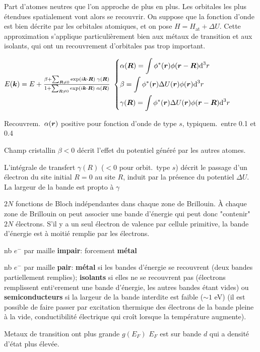 Part d'atomes neutres que l'on approche de plus en plus.
Les orbitales les plus étendues spatialement vont alors se recouvrir. 
On suppose que la fonction d'onde est bien décrite par les orbitales
atomiques, et on pose $H = H_{\text{at}} + \Delta U$. 
Cette approximation s'applique particulièrement
bien aux métaux de transition et aux isolants, qui ont un recouvrement d'orbitales pas
trop important.
\begin{squishlist}
    \item $E(\bm{k}) = E + \frac{\beta + \sum_{\bm{R} \neq 0}\exp(i\bm{k} \cdot \bm{R}) \; \gamma(\bm{R})}{1 + \sum_{\bm{R} \neq 0}\exp(i\bm{k} \cdot \bm{R})\; \alpha(\bm{R})}$
    $\left\{ \begin{aligned}
        & \alpha(\bm{R}) = \int \phi^*(\bm{r})\phi(\bm{r} - \bm{R}) \textrm{d}^3 r \\
        & \beta = \int \phi^*(\bm{r})\Delta U (\bm{r}) \phi(\bm{r}) \textrm{d}^3 r \\
        & \gamma(\bm{R}) = \int \phi^*(\bm{r})\Delta U (\bm{r}) \phi(\bm{r} - \bm{R}) \textrm{d}^3 r
    \end{aligned} \right.$
    \item Recouvrem.\ $\alpha(\bm{r})$ positive pour fonction d'onde de type $s$, typiquem.\ entre 0.1 et 0.4
    \item Champ cristallin $\beta < 0$ décrit l'effet du potentiel généré par les autres atomes.
    \item L'intégrale de transfert $\gamma(R)$ ($<0$ pour orbit.\ type $s$) décrit le passage d'un électron du site initial $R = 0$ au site $R$, induit par la présence du potentiel $\Delta U$.
    La largeur de la bande est propto à $\gamma$
\end{squishlist}

$2N$ fonctions de Bloch indépendantes dans chaque zone de Brillouin.
À chaque zone de Brillouin on peut associer une bande d'énergie qui peut donc "contenir" $2N$ électrons.
S’il y a un seul électron de valence par cellule primitive, la bande d’énergie
est à moitié remplie par les électrons.
\begin{squishlist}
    \item  nb $e^-$ par maille \textbf{impair}: forcement \textbf{métal}
    \item  nb $e^-$ par maille \textbf{pair}: \textbf{métal} si les bandes d'énergie se recouvrent (deux bandes partiellement remplies); \textbf{isolants} si elles ne se recouvrent pas (électrons remplissent enti`erement une bande d’énergie, les autres bandes étant vides) ou \textbf{semiconducteurs} si la largeur de la bande interdite est faible ($\sim 1 $ eV) (il est possible de faire passer par excitation thermique des électrons de la bande pleine à la vide, conductibilité électrique qui croît lorsque la température augmente).
    \item Metaux de transition ont plus grande $g(E_F)$ $E_F$ est sur bande $d$ qui a densité d'état plus élevée.
\end{squishlist}


